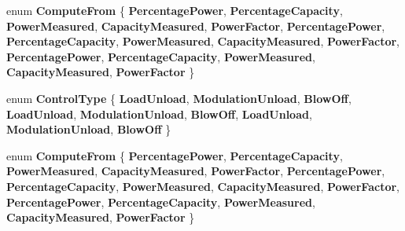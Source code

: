 \begin{DoxyCompactItemize}
enum {\bfseries Compute\+From} \{ \newline
{\bfseries Percentage\+Power}, 
{\bfseries Percentage\+Capacity}, 
{\bfseries Power\+Measured}, 
{\bfseries Capacity\+Measured}, 
\newline
{\bfseries Power\+Factor}, 
{\bfseries Percentage\+Power}, 
{\bfseries Percentage\+Capacity}, 
{\bfseries Power\+Measured}, 
\newline
{\bfseries Capacity\+Measured}, 
{\bfseries Power\+Factor}, 
{\bfseries Percentage\+Power}, 
{\bfseries Percentage\+Capacity}, 
\newline
{\bfseries Power\+Measured}, 
{\bfseries Capacity\+Measured}, 
{\bfseries Power\+Factor}
 \}
\item 
\mbox{\label{class_compressed_air_centrifugal_base_a7bd6c25d4b8ac52181287addc5c951e7}} 
enum {\bfseries Control\+Type} \{ \newline
{\bfseries Load\+Unload}, 
{\bfseries Modulation\+Unload}, 
{\bfseries Blow\+Off}, 
{\bfseries Load\+Unload}, 
\newline
{\bfseries Modulation\+Unload}, 
{\bfseries Blow\+Off}, 
{\bfseries Load\+Unload}, 
{\bfseries Modulation\+Unload}, 
\newline
{\bfseries Blow\+Off}
 \}
\item 
\mbox{\label{class_compressed_air_centrifugal_base_a08a485bca80bf3fc298560a403328a8c}} 
enum {\bfseries Compute\+From} \{ \newline
{\bfseries Percentage\+Power}, 
{\bfseries Percentage\+Capacity}, 
{\bfseries Power\+Measured}, 
{\bfseries Capacity\+Measured}, 
\newline
{\bfseries Power\+Factor}, 
{\bfseries Percentage\+Power}, 
{\bfseries Percentage\+Capacity}, 
{\bfseries Power\+Measured}, 
\newline
{\bfseries Capacity\+Measured}, 
{\bfseries Power\+Factor}, 
{\bfseries Percentage\+Power}, 
{\bfseries Percentage\+Capacity}, 
\newline
{\bfseries Power\+Measured}, 
{\bfseries Capacity\+Measured}, 
{\bfseries Power\+Factor}
 \}
\end{DoxyCompactItemize}
